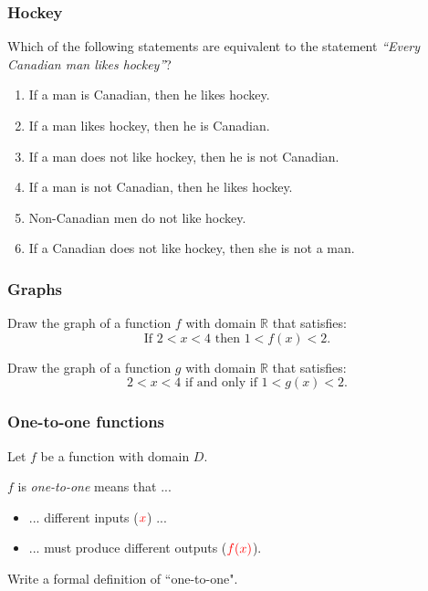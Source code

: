 \documentclass[14pt]{beamer}
\newcommand{\rojo}[1]{{\color{red} #1}}
\begin{document}

\begin{frame}
\frametitle{Hockey}

Which of the following statements are equivalent to the statement \quad
\emph{``Every Canadian man likes hockey''}? 

	\begin{enumerate}
		\item  If a man is Canadian, then he likes hockey.
		\item  If a man likes hockey, then he is Canadian.
		\item  If a man does not like hockey, then he is not Canadian.
		\item  If a man is not Canadian, then he likes hockey.
		\item  Non-Canadian men do not like hockey.
		\item  If a Canadian does not like hockey, then she is not a man.
	\end{enumerate}
\end{frame}


\begin{frame}
\frametitle{Graphs}

Draw the graph of a function $f$ with domain $\mathbb{R}$ that satisfies:
	\begin{equation*}
		\mbox{If } 2<x<4 \mbox{ then } 1<f(x)<2.  	
	\end{equation*}
\vfill

Draw the graph of a function $g$ with domain $\mathbb{R}$ that satisfies:
	\begin{equation*}
		2<x<4 \mbox{ if and only if } 1 < g(x) < 2.
	\end{equation*}
\vfill

\end{frame}


\begin{frame}
\frametitle{One-to-one functions}

Let $f$ be a function with domain $D$.  \\

\vfill

$f$ is \emph{one-to-one} means that ...
	\begin{itemize}
		\item ... different inputs ($\rojo{x}$)  ...
		\item ... must produce different outputs ($\rojo{f(x)}$). 
	\end{itemize}

\pause \vfill
	
\begin{block}{}
	Write a formal definition of ``one-to-one".
\end{block}

\end{frame}
\end{document}
